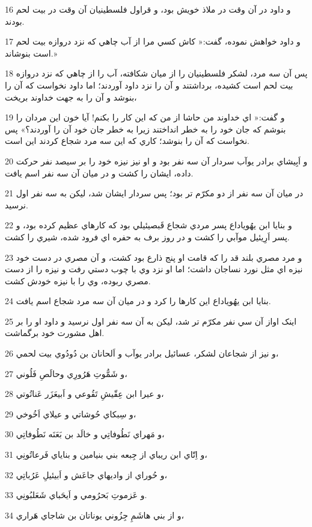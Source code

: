 \par 16 و داود در آن وقت در ملاذ خويش بود، و قراول فلسطينيان آن وقت در بيت لحم بودند.
\par 17 و داود خواهش نموده، گفت:« کاش کسي مرا از آب چاهي که نزد دروازه بيت لحم است بنوشاند.»
\par 18 پس آن سه مرد، لشکر فلسطينيان را از ميان شکافته، آب را از چاهي که نزد دروازه بيت لحم است کشيده، برداشتند و آن را نزد داود آوردند؛ اما داود نخواست که آن را بنوشد و آن را به جهت خداوند بريخت،
\par 19 و گفت:« اي خداوند من حاشا از من که اين کار را بکنم! آيا خون اين مردان را بنوشم که جان خود را به خطر انداختند زيرا به خطر جان خود آن را آوردند؟» پس نخواست که آن را بنوشد؛ کاري که اين سه مرد شجاع کردند اين است.
\par 20 و اَبِيشاي برادر يوآب سردار آن سه نفر بود و او نيز نيزه خود را بر سيصد نفر حرکت داده، ايشان را کشت و در ميان آن سه نفر اسم يافت.
\par 21 در ميان آن سه نفر از دو مکرّم تر بود؛ پس سردار ايشان شد، ليکن به سه نفر اول نرسيد.
\par 22 و بنايا ابن يهُوياداع پسر مردي شجاع قَبصيئيلي بود که کارهاي عظيم کرده بود، و پسر اَرِيئيل موآبي را کشت و در روز برف به حفره اي فرود شده، شيري را کشت.
\par 23 و مرد مصري بلند قد را که قامت او پنج ذارع بود کشت، و آن مصري در دست خود نيزه اي مثل نورد نساجان داشت؛ اما او نزد وي با چوب دستي رفت و نيزه را از دست مصري ربوده، وي را با نيزه خودش کشت.
\par 24 بنايا ابن يهُوياداع اين کارها را کرد و در ميان آن سه مرد شجاع اسم يافت.
\par 25 اينک اواز آن سي نفر مکرّم تر شد، ليکن به آن سه نفر اول نرسيد و داود او را بر اهل مشورت خود برگماشت. 
\par 26 و نيز از شجاعان لشکر، عسائيل برادر يوآب و اَلحانان بن دُودُوي بيت لحمي،
\par 27 و شَمُّوتِ هَرُورِي وحالَصِ فَلُوني،
\par 28 و عيرا ابن عِقّيشِ تَقُوعي و اَبيعَزَر عَناتُوتي،
\par 29 و سِبکاي حُوشاتي و عيلاي اَخُوخي،
\par 30 و مَهراي نَطُوفاتِي و خالَد بن بَعَنَه نَطُوفاتِي،
\par 31 و اِتّاي ابن ريباي از جِبعه بني بنيامين و بناياي فَرعاتُونِي،
\par 32 و حُوراي از واديهاي جاعَش و اَبيئيلِ عَرُباتِي،
\par 33 و عَزموتِ بَحرُومي و اَيحَباي شَعَلبُونِي.
\par 34 و از بني هاشَمِ جِزُوني يوناتان بن شاجاي هَراري،
